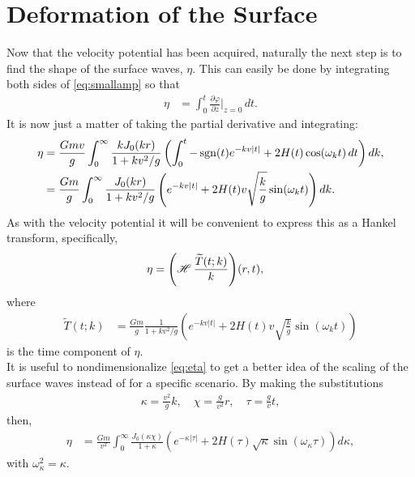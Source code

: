 \section{Deformation of the Surface}

Now that the velocity potential has been acquired, naturally the next step is to find the shape of the surface waves, $\eta$. This can easily be done by integrating both sides of \eqref{eq:smallamp} so that 
\begin{align*}
\eta &= \int_0^t \frac{\partial \varphi}{\partial z} \bigg|_{z=0} \, dt.
\end{align*}
It is now just a matter of taking the partial derivative and integrating:
\begin{align}
\eta &= \frac{Gmv}{g} \int_0^\infty \frac{k J_0(kr)}{1+kv^2/g} \left( \int_0^t  -\operatorname{sgn}(t)e^{-kv|t|} + 2H(t)\cos(\omega_k t) \, dt \right) dk, \nonumber \\
&= \frac{Gm}{g} \int_0^\infty \frac{J_0(kr)}{1+kv^2/g} \left( e^{-kv|t|} + 2H(t) v \sqrt{\frac{k}{g}} \sin(\omega_k t) \right) dk.
\label{eq:eta}
\end{align}
As with the velocity potential it will be convenient to express this as a Hankel transform, specifically,
\begin{align*}
\eta &= {\left( \operatorname{\mathscr{H}}_{} \frac{\widetilde{T}(t;k)}{k} \right) }(r,t),
\label{eq:etahank}
\end{align*}
where
\begin{align*}
\widetilde{T}(t;k) &= \frac{Gm}{g} \frac{1}{1+kv^2/g} \left( e^{-kv|t|} + 2H(t) v \sqrt{\frac{k}{g}} \sin(\omega_k t) \right)
\end{align*}
is the time component of $\eta$. \\

It is useful to nondimensionalize \eqref{eq:eta} to get a better idea of the scaling of the surface waves instead of for a specific scenario. By making the substitutions
\begin{align*}
\kappa = \frac{v^2}{g}k, \quad \chi = \frac{g}{v^2}r, \quad \tau = \frac{g}{v}t,
\end{align*}
then,
\begin{align*}
\eta &= \frac{Gm}{v^2} \int_0^\infty \frac{J_0(\kappa \chi)}{1+\kappa} \left( e^{-\kappa|\tau|} + 2H(\tau) \sqrt{\kappa} \sin(\omega_\kappa \tau) \right) d\kappa,
\end{align*}
with $\omega_\kappa^2 = \kappa$.

